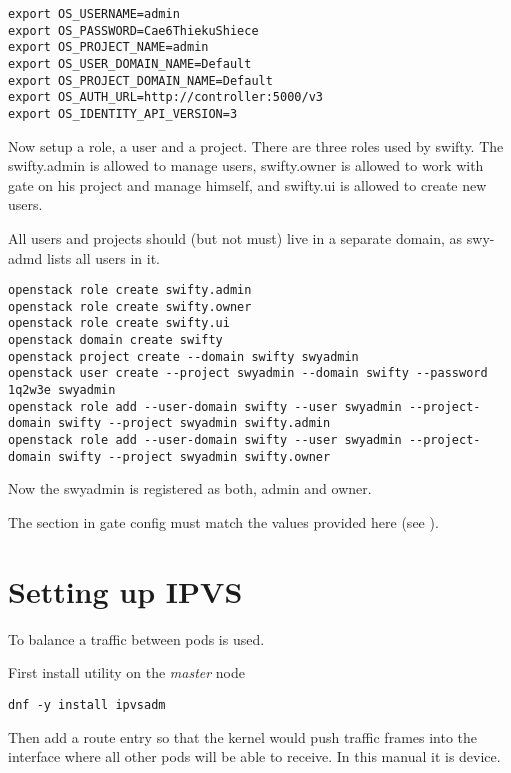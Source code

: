 \begin{lstlisting}
export OS_USERNAME=admin
export OS_PASSWORD=Cae6ThiekuShiece
export OS_PROJECT_NAME=admin
export OS_USER_DOMAIN_NAME=Default
export OS_PROJECT_DOMAIN_NAME=Default
export OS_AUTH_URL=http://controller:5000/v3
export OS_IDENTITY_API_VERSION=3
\end{lstlisting}

Now setup a role, a user and a project. There are three roles
used by swifty. The swifty.admin is allowed to manage users,
swifty.owner is allowed to work with gate on his project and
manage himself, and swifty.ui is allowed to create new users.

All users and projects should (but not must) live in a separate
domain, as swy-admd lists all users in it.

\begin{lstlisting}
openstack role create swifty.admin
openstack role create swifty.owner
openstack role create swifty.ui
openstack domain create swifty
openstack project create --domain swifty swyadmin
openstack user create --project swyadmin --domain swifty --password 1q2w3e swyadmin
openstack role add --user-domain swifty --user swyadmin --project-domain swifty --project swyadmin swifty.admin
openstack role add --user-domain swifty --user swyadmin --project-domain swifty --project swyadmin swifty.owner
\end{lstlisting}

Now the swyadmin is registered as both, admin and owner.

The  section in gate config must match the values
provided here (see ).

\section{Setting up IPVS}
\label{sec:setup-nfs}

To balance a traffic between pods
 is used.

First install  utility on the \emph{master} node

\begin{lstlisting}
dnf -y install ipvsadm
\end{lstlisting}

Then add a route entry so that the kernel would push traffic
frames into the interface where all other pods will be able
to receive. In this manual it is  device.

